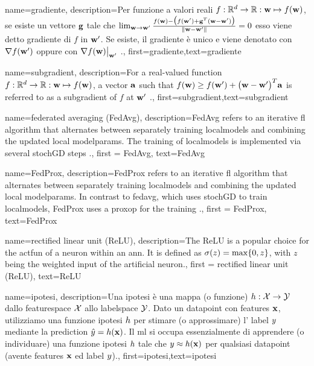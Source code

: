 {name={gradiente},
	description={Per funzione a valori reali $f: \mathbb{R}^{d} \rightarrow \mathbb{R}: {\bf w} \mapsto f({\bf w})$, 
	se esiste un vettore ${\bf g}$ tale che $\lim_{{\bf w} \rightarrow {\bf w}'} \frac{f({\bf w}) - \big(f({\bf w}')+ {\bf g}^{T} ({\bf w}- {\bf w}') \big) }{\| {\bf w}-{\bf w}'\|}=0$ 
	esso viene detto gradiente di $f$ in ${\bf w}'$. Se esiste, il gradiente è unico e viene 
	denotato con $\nabla f({\bf w}')$ oppure con $\nabla f({\bf w})\big|_{{\bf w}'}$ \cite{RudinBookPrinciplesMatheAnalysis}.},
	first={gradiente},text={gradiente} 
}

{name={subgradient},
description={For a real-valued function $f: \mathbb{R}^{d} \rightarrow \mathbb{R}: {\bf w} \mapsto f({\bf w})$, 
		a vector ${\bf a}$ such that $f({\bf w}) \geq  f({\bf w}') +\big({\bf w}-{\bf w}' \big)^{T} {\bf a}$ is 
		referred to as a subgradient of $f$ at ${\bf w}'$ \cite{BertCvxAnalOpt,BertsekasNonLinProgr}.},
	first={subgradient},text={subgradient} 
}

{name={federated averaging (FedAvg)},
	description={FedAvg refers to an iterative \gls{fl} \gls{algorithm} that alternates between separately training \gls{localmodel}s and combining the updated local \glspl{modelparam}. The training of \gls{localmodel}s 
		is implemented via several \gls{stochGD} steps \cite{pmlr-v54-mcmahan17a}.}, 
		first = {FedAvg}, text={FedAvg} 
}

{name={FedProx},
	description={FedProx refers to an iterative \gls{fl} \gls{algorithm} that alternates between separately training \gls{localmodel}s and combining the updated local \glspl{modelparam}. In contrast to \gls{fedavg}, which uses 
		\gls{stochGD} to train \gls{localmodel}s, FedProx uses a \gls{proxop} for the training \cite{FedProx2020}.}, 
	first = {FedProx}, text={FedProx} 
}

{name={rectified linear unit (ReLU)},
	description={The ReLU is 
		a popular choice for the \gls{actfun} of a neuron within an \gls{ann}. It is defined 
		as $\sigma(z) = \max\{0,z\}$, with $z$ being the weighted input of the artificial 
		neuron.}, first = {rectified linear unit (ReLU)}, text={ReLU} 
}

{name={ipotesi},
	description={Una ipotesi è una mappa (o funzione) $h: \mathcal{X} \rightarrow \mathcal{Y}$ dallo 
		\gls{featurespace} $\mathcal{X}$ allo \gls{labelspace} $\mathcal{Y}$. 
		Dato un \gls{datapoint} con \glspl{feature} ${\bf x}$, utilizziamo una funzione ipotesi $h$
		per stimare (o approssimare) l' \gls{label} $y$ mediante la \gls{prediction}  
		$\hat{y} = h({\bf x})$. Il \gls{ml} si occupa essenzialmente di apprendere (o individuare) 
		una funzione ipotesi $h$ tale che $y \approx h({\bf x})$ 
		per qualsiasi \gls{datapoint} (avente \glspl{feature} ${\bf x}$ ed \gls{label} $y$).},
	first={ipotesi},text={ipotesi}  
}



